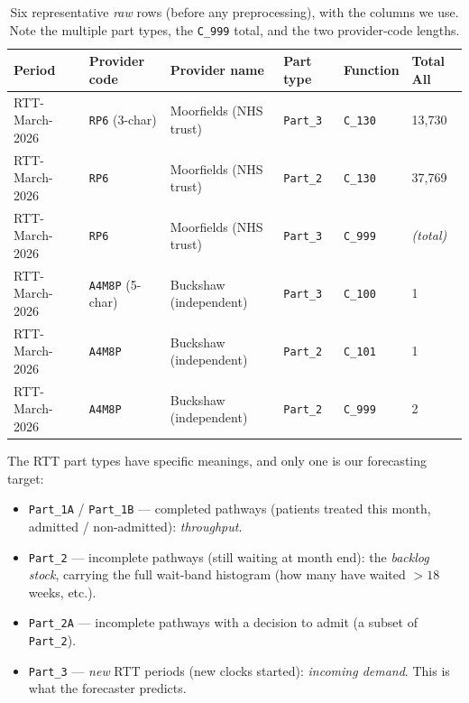 \documentclass[11pt,a4paper]{article}
\newcommand{\code}[1]{\texttt{\small #1}}
\begin{document}
\begin{table}[htbp]\centering
\caption{Six representative \emph{raw} rows (before any preprocessing), with the columns we use. Note
the multiple part types, the \code{C\_999} total, and the two provider-code lengths.}\label{tab:raw}
\small
\begin{tabular}{llllll}
\toprule
Period & Provider code & Provider name & Part type & Function & Total All \\
\midrule
RTT-March-2026 & \code{RP6} (3-char) & Moorfields (NHS trust) & \code{Part\_3} & \code{C\_130} & 13{,}730 \\
RTT-March-2026 & \code{RP6} & Moorfields (NHS trust) & \code{Part\_2} & \code{C\_130} & 37{,}769 \\
RTT-March-2026 & \code{RP6} & Moorfields (NHS trust) & \code{Part\_3} & \code{C\_999} & \emph{(total)} \\
RTT-March-2026 & \code{A4M8P} (5-char) & Buckshaw (independent) & \code{Part\_3} & \code{C\_100} & 1 \\
RTT-March-2026 & \code{A4M8P} & Buckshaw (independent) & \code{Part\_2} & \code{C\_101} & 1 \\
RTT-March-2026 & \code{A4M8P} & Buckshaw (independent) & \code{Part\_2} & \code{C\_999} & 2 \\
\bottomrule
\end{tabular}
\end{table}

The RTT part types have specific meanings, and only one is our forecasting target:
\begin{itemize}[nosep]
  \item \code{Part\_1A} / \code{Part\_1B} --- completed pathways (patients treated this month, admitted
        / non-admitted): \emph{throughput}.
  \item \code{Part\_2} --- incomplete pathways (still waiting at month end): the \emph{backlog stock},
        carrying the full wait-band histogram (how many have waited $>18$ weeks, etc.).
  \item \code{Part\_2A} --- incomplete pathways with a decision to admit (a subset of \code{Part\_2}).
  \item \code{Part\_3} --- \emph{new} RTT periods (new clocks started): \emph{incoming demand}. This is
        what the forecaster predicts.
\end{itemize}
\end{document}
